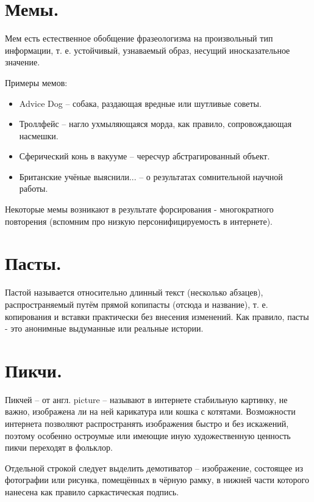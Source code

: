 \section{Мемы.}

\opred

Мем есть естественное обобщение фразеологизма на произвольный тип информации, т. е. устойчивый, узнаваемый образ, несущий иносказательное значение.

Примеры мемов:

\begin{itemize}

\item Advice Dog -- собака, раздающая вредные или шутливые советы.

\item Троллфейс -- нагло ухмыляющаяся морда, как правило, сопровождающая насмешки.

\item Сферический конь в вакууме -- чересчур абстрагированный объект.

\item Британские учёные выяснили... -- о результатах сомнительной научной работы.

\end{itemize}

Некоторые мемы возникают в результате форсирования - многократного повторения (вспомним про низкую персонифицируемость в интернете).

\section{Пасты.}

Пастой называется относительно длинный текст (несколько абзацев), распространяемый путём прямой копипасты (отсюда и название), т. е. копирования и вставки практически без внесения изменений. Как правило, пасты - это анонимные выдуманные или реальные истории.


\section{Пикчи.}

Пикчей -- от англ. picture -- называют в интернете стабильную картинку, не важно, изображена ли на ней карикатура или кошка с котятами. Возможности интернета позволяют распространять изображения быстро и без искажений, поэтому особенно остроумые или имеющие иную художественную ценность пикчи переходят в фольклор.

Отдельной строкой следует выделить демотиватор -- изображение, состоящее из фотографии или рисунка, помещённых в чёрную рамку, в нижней части которого нанесена как правило саркастическая подпись.


